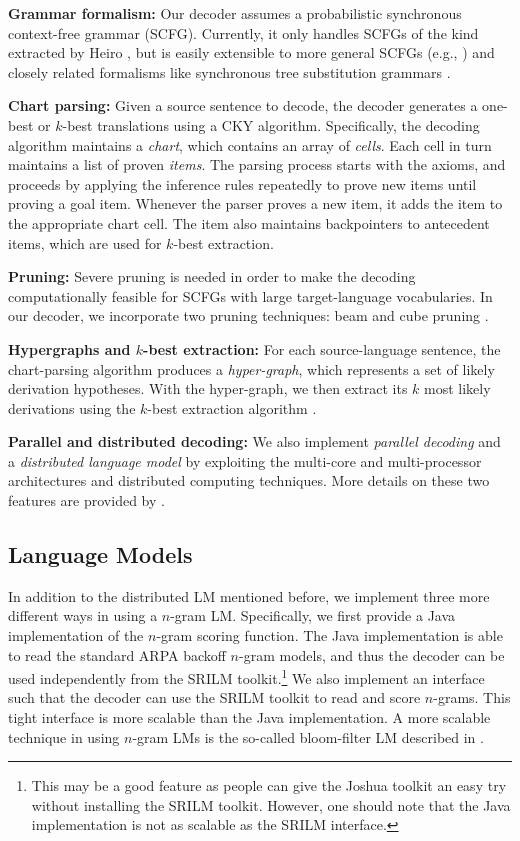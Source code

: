 \documentclass[11pt]{article}
\begin{document}
\textbf{Grammar formalism:} Our decoder assumes a probabilistic synchronous context-free grammar (SCFG). Currently, it only handles SCFGs of the kind extracted by Heiro \cite{hiero-david}, but is easily extensible to more general SCFGs (e.g., \cite{syntax2006-isi}) and closely related formalisms like synchronous tree substitution grammars \cite{syntax-jason}.


\textbf{Chart parsing:} Given a source sentence to decode, the decoder generates a one-best or $k$-best translations using a CKY algorithm. Specifically,
the decoding algorithm  maintains a \emph{chart}, which contains an array of \emph{cells}. Each cell in turn maintains a list of proven \emph{items}. The parsing process starts with the axioms, and proceeds by applying the inference rules repeatedly to prove new items until proving a goal item. Whenever the parser proves a new item, it adds the item to the appropriate chart cell. The item also maintains backpointers to antecedent items, which are used for $k$-best extraction.

\textbf{Pruning:} Severe pruning is needed in order to make the decoding computationally feasible for SCFGs with large target-language vocabularies. In our decoder, we incorporate two pruning techniques: beam and cube pruning \cite{hiero-david}.

\textbf{Hypergraphs and $k$-best extraction:}
For each source-language sentence, the chart-parsing algorithm produces a \emph{hyper-graph}, which represents a set of likely derivation hypotheses. With the hyper-graph, we then extract its $k$ most likely derivations using the $k$-best extraction algorithm \cite{liang-kbest}.

\textbf{Parallel and distributed decoding:}
We also implement \emph{parallel decoding} and a \emph{distributed language model} by exploiting the multi-core and multi-processor architectures and distributed computing techniques. More details on these two features are provided by .

\subsection{Language Models}
In addition to the distributed LM mentioned before, we implement three more different ways in using a $n$-gram LM. Specifically, we first provide a Java implementation of the $n$-gram scoring function. The Java implementation is able to read the standard ARPA backoff $n$-gram models, and thus the decoder can be used independently from the SRILM toolkit.\footnote{This may be a good feature as people can give the Joshua toolkit an easy try without installing the SRILM toolkit. However, one should note that the Java implementation is not as scalable as the SRILM interface.} We also implement an interface such that the decoder can use the SRILM toolkit to read and score $n$-grams. This tight interface is more scalable than the Java implementation. A more scalable technique in using $n$-gram LMs is the so-called bloom-filter LM described in .
\end{document}
